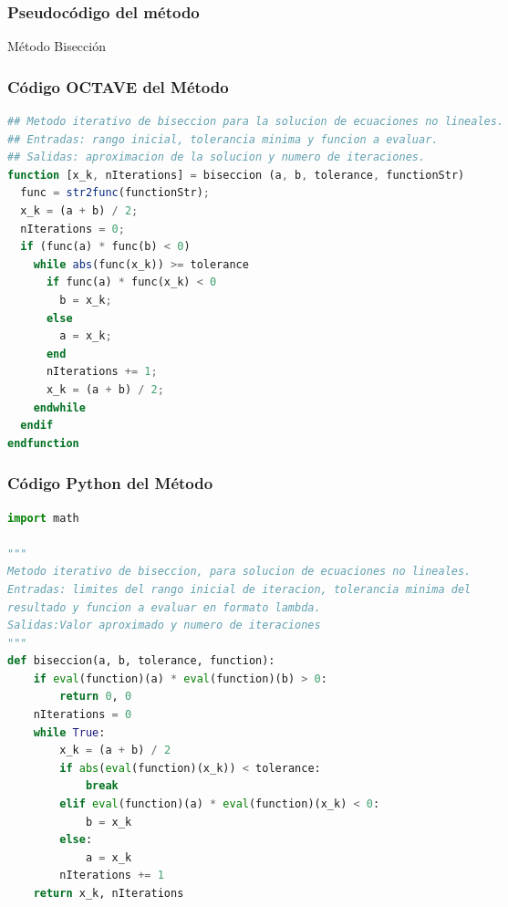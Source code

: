 \documentclass[12pt]{article}
\begin{document}
\subsubsection{Pseudocódigo del método}
\begin{algorithm}[H]
\caption{Método Bisección}
     \SetAlgoLined
     
\end{algorithm}
\subsubsection{Código OCTAVE del Método}

\begin{lstlisting}[language=OCTAVE, caption=Implementación del método de bisección en Octave]
## Metodo iterativo de biseccion para la solucion de ecuaciones no lineales.
## Entradas: rango inicial, tolerancia minima y funcion a evaluar.
## Salidas: aproximacion de la solucion y numero de iteraciones.
function [x_k, nIterations] = biseccion (a, b, tolerance, functionStr)
  func = str2func(functionStr);
  x_k = (a + b) / 2;  
  nIterations = 0;
  if (func(a) * func(b) < 0)
    while abs(func(x_k)) >= tolerance
      if func(a) * func(x_k) < 0
        b = x_k;
      else
        a = x_k;
      end
      nIterations += 1;
      x_k = (a + b) / 2;
    endwhile
  endif
endfunction
\end{lstlisting}
\subsubsection{Código Python del Método}

\begin{lstlisting}[language=Python, caption=Implementación del método de bisección en python]
import math

"""
Metodo iterativo de biseccion, para solucion de ecuaciones no lineales.
Entradas: limites del rango inicial de iteracion, tolerancia minima del
resultado y funcion a evaluar en formato lambda.
Salidas:Valor aproximado y numero de iteraciones
"""
def biseccion(a, b, tolerance, function):
    if eval(function)(a) * eval(function)(b) > 0:
        return 0, 0
    nIterations = 0
    while True:
        x_k = (a + b) / 2
        if abs(eval(function)(x_k)) < tolerance:
            break
        elif eval(function)(a) * eval(function)(x_k) < 0:
            b = x_k
        else:
            a = x_k
        nIterations += 1
    return x_k, nIterations
    \end{lstlisting}
\end{document}
